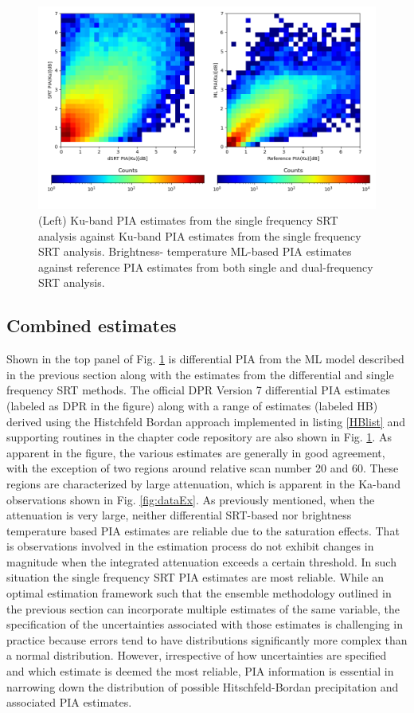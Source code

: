 \documentclass[10pt]{ietbook}
\begin{document}
\begin{figure} \label{fig:ML_PIA}
    \centerline{}
    \includegraphics[width=\textwidth]{ML_PIA.png}
    
    \caption{(Left) Ku-band PIA estimates from the single frequency SRT analysis against Ku-band PIA estimates from the single frequency SRT analysis. Brightness-
    temperature ML-based PIA estimates against reference PIA estimates from both single and dual-frequency SRT analysis.}
\end{figure}

\subsection{Combined estimates}
Shown in the top panel of Fig. \ref{fig:ML_PIA} is differential PIA from the ML model described in the previous section along with 
the estimates from the differential and single frequency SRT methods.  The official DPR Version 7 differential PIA 
estimates (labeled as DPR in the figure) along with a range of estimates (labeled HB) derived using the Histchfeld Bordan 
approach implemented in listing \ref{HBlist}
and supporting routines in the chapter code repository are also shown in Fig. \ref{fig:ML_PIA}. As apparent in the figure,
the various estimates are generally in good agreement, with the exception of two regions around relative scan number 20 and 60.
These regions are characterized by large attenuation, which is apparent in the Ka-band observations shown in
Fig. \ref{fig:dataEx}. As previously mentioned, when the attenuation is very large, neither differential SRT-based 
nor brightness temperature based PIA estimates are reliable due to the saturation effects.  That is observations involved
in the estimation process do not exhibit changes in magnitude when the integrated attenuation exceeds a certain threshold.
In such situation the single frequency SRT PIA estimates are most reliable. While an optimal estimation framework such
that the ensemble methodology outlined in the previous section can incorporate multiple estimates of the same variable,
the specification of the uncertainties associated with those estimates is challenging in practice because errors tend
to have distributions significantly more complex than a normal distribution. However, irrespective of how uncertainties
are specified and which estimate is deemed the most reliable, PIA information is essential in narrowing down the distribution 
of possible Hitschfeld-Bordan precipitation and associated PIA estimates.
\end{document}
